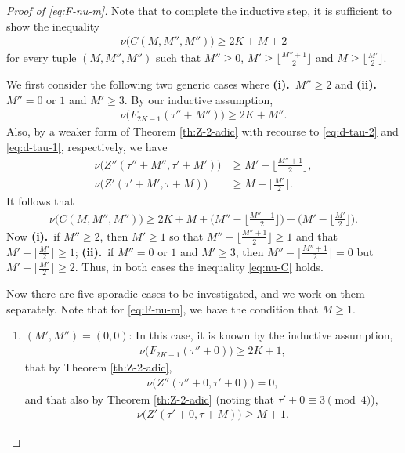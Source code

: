 \documentclass[12pt,reqno]{amsart}
\numberwithin{equation}{section}
\theoremstyle{theorem}
\theoremstyle{definition}
\begin{document}
\begin{proof}[Proof of \eqref{eq:F-nu-m}]
	Note that to complete the inductive step, it is sufficient to show the inequality
	\begin{align}\label{eq:nu-C}
		\nu\big(C(M,M'',M'')\big) \ge 2K+M+2
	\end{align}
	for every tuple $(M,M'',M'')$ such that $M''\ge 0$, $M'\ge \lfloor\tfrac{M''+1}{2}\rfloor$ and $M\ge \lfloor\tfrac{M'}{2}\rfloor$.
	
	We first consider the following two generic cases where \textbf{(i).}~$M''\ge 2$ and \textbf{(ii).}~$M''=0$ or $1$ and $M'\ge 3$. By our inductive assumption,
	\begin{align*}
		\nu\big(F_{2K-1}(\tau'' + M'')\big) \ge 2K + M''.
	\end{align*}
	Also, by a weaker form of Theorem \ref{th:Z-2-adic} with recourse to \eqref{eq:d-tau-2} and \eqref{eq:d-tau-1}, respectively, we have
	\begin{align*}
		\nu\big(Z''(\tau'' + M'',\tau'+M')\big) &\ge M'-\lfloor\tfrac{M''+1}{2}\rfloor,\\
		\nu\big(Z'(\tau' + M',\tau+M)\big) &\ge M-\lfloor\tfrac{M'}{2}\rfloor.
	\end{align*}
	It follows that
	\begin{align*}
		\nu\big(C(M,M'',M'')\big) \ge 2K+M+\big(M''-\lfloor\tfrac{M''+1}{2}\rfloor\big) + \big(M'-\lfloor\tfrac{M'}{2}\rfloor\big).
	\end{align*}
	Now \textbf{(i).}~if $M''\ge 2$, then $M'\ge 1$ so that $M''-\lfloor\tfrac{M''+1}{2}\rfloor\ge 1$ and that $M'-\lfloor\tfrac{M'}{2}\rfloor\ge 1$; \textbf{(ii).}~if $M''=0$ or $1$ and $M'\ge 3$, then $M''-\lfloor\tfrac{M''+1}{2}\rfloor= 0$ but $M'-\lfloor\tfrac{M'}{2}\rfloor\ge 2$. Thus, in both cases the inequality \eqref{eq:nu-C} holds.
	
	Now there are five sporadic cases to be investigated, and we work on them separately. Note that for \eqref{eq:F-nu-m}, we have the condition that $M\ge 1$.
	\begin{enumerate}[label={\textbf{(\alph*).}},leftmargin=*,labelsep=0cm,align=left]
		\item $(M',M'')=(0,0)$: In this case, it is known by the inductive assumption,
		\begin{align*}
			\nu\big(F_{2K-1}(\tau'' + 0)\big) \ge 2K + 1,
		\end{align*}
		that by Theorem \ref{th:Z-2-adic},
		\begin{align*}
			\nu\big(Z''(\tau'' + 0,\tau'+0)\big) = 0,
		\end{align*}
		and that also by Theorem \ref{th:Z-2-adic} (noting that $\tau'+0\equiv 3\pmod{4}$),
		\begin{align*}
			\nu\big(Z'(\tau' + 0,\tau+M)\big) \ge M+1.
		\end{align*}
	

\end{enumerate}
\end{proof}
\end{document}
